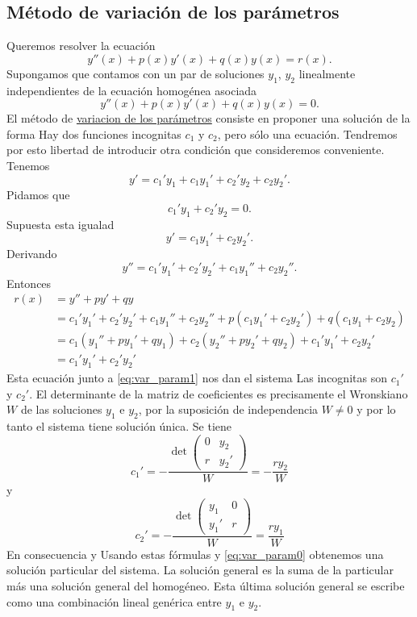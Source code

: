 \subsection{Método de variación de los parámetros}

Queremos resolver la ecuación
\begin{equation}\label{eq:2orden_gen}
y''(x)+p(x)y'(x)+q(x)y(x)=r(x).
\end{equation}
Supongamos que contamos con un par de soluciones $y_1$, $y_2$ linealmente independientes de la ecuación homogénea asociada
\begin{equation}\label{eq:hom_asoc}
y''(x)+p(x)y'(x)+q(x)y(x)=0.
\end{equation}
El método de \href{http://en.wikipedia.org/wiki/Variation_of_parameters}{variacion de los parámetros} consiste en proponer una solución de la forma
Hay dos funciones incognitas $c_1$ y $c_2$, pero sólo una ecuación. Tendremos
por esto libertad de introducir otra condición que consideremos conveniente.
Tenemos
\[
y'=c_1'y_1+c_1y_1'+c_2'y_2+c_2y_2'.
\]
Pidamos que
\begin{equation}\label{eq:var_param1}
c_1'y_1+c_2'y_2=0.
\end{equation}
Supuesta esta igualad
\[ y'= c_1y_1'+c_2y_2'.\]
Derivando
\[ y''= c_1'y_1'+c_2'y_2'+c_1y_1''+c_2y_2''.\]
Entonces
\[
\begin{split}
r(x)&=y''+py'+qy\\
&=c_1'y_1'+c_2'y_2'+c_1y_1''+c_2y_2''+p(c_1y_1'+c_2y_2')+q(c_1y_1+c_2y_2)\\
&=c_1(y_1''+py_1'+qy_1)+c_2(y_2''+py_2'+qy_2)+c_1'y_1'+c_2y_2'\\
&=c_1'y_1'+c_2'y_2'
\end{split}
\]
Esta ecuación junto a \eqref{eq:var_param1} nos dan el sistema
Las incognitas son $c_1'$ y $c_2'$. El determinante de la matriz de coeficientes es precisamente el Wronskiano $W$ de las soluciones $y_1$ e $y_2$, por la suposición
de independencia $W\neq 0$ y por lo tanto el sistema tiene solución única.
Se tiene
\[c_1'=-\frac{\det\begin{pmatrix}
0 & y_2\\
r & y_2'
\end{pmatrix}
}{W}=-\frac{ry_2}{W}
\]
y
\[c_2'=-\frac{\det\begin{pmatrix}
y_1 & 0\\
y_1' & r
\end{pmatrix}
}{W}=\frac{ry_1}{W}
\]
En consecuencia
y
Usando estas fórmulas y \eqref{eq:var_param0} obtenemos una solución particular del sistema. La solución general es la suma de la particular más
una solución general del homogéneo. Esta última solución general se escribe como una combinación lineal genérica entre $y_1$ e $y_2$.

